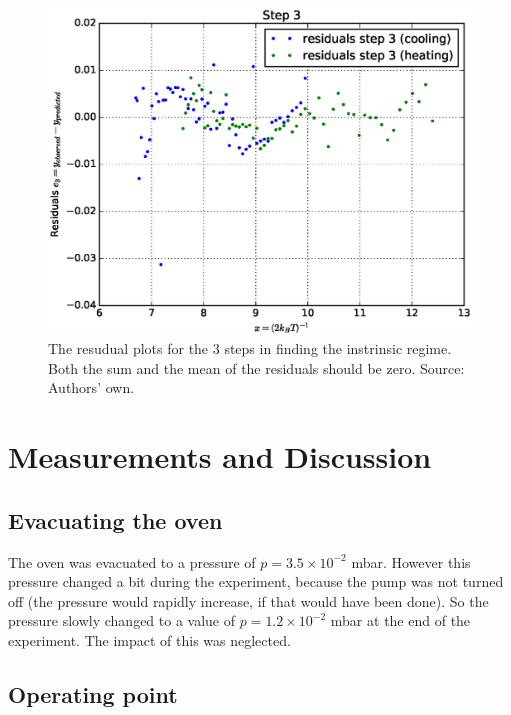 \documentclass[a4paper]{article}
\begin{document}
\begin{figure}[H]
\begin{minipage}[t]{0.3\textwidth}
	\end{minipage}
	\begin{minipage}[t]{0.3\textwidth}
		\begin{center}
		\includegraphics[width=1.0\textwidth]{plots/residuals_step3.eps}
		\end{center}
	\end{minipage}
	\caption[blubb]{The resudual plots for the 3 steps in finding the instrinsic regime. Both the sum and the mean of the residuals should be zero. Source: Authors' own.}
	\label{fig:residuals}
\end{figure}

\section{Measurements and Discussion}

\subsection{Evacuating the oven}

The oven was evacuated to a pressure of $p = 3.5 \times 10^{-2}$ mbar. However this pressure changed a bit during the experiment, because the pump was not turned off (the pressure would rapidly increase, if that would have been done). So the pressure slowly changed to a value of $p = 1.2\times 10^{-2}$ mbar at the end of the experiment. The impact of this was neglected.

\subsection{Operating point}
\end{document}
